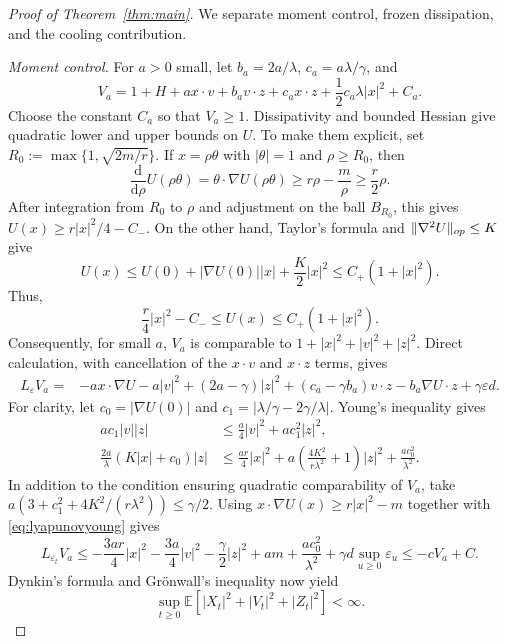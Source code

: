\documentclass[10pt,a4paper]{amsart}
\newcommand{\E}{\mathbb E}
\newcommand{\dd}{\mathrm d}
\newcommand{\eps}{\varepsilon}
\theoremstyle{plain}
\theoremstyle{definition}
\begin{document}
\begin{proof}[Proof of Theorem~\ref{thm:main}]
We separate moment control, frozen dissipation, and the cooling contribution.

\emph{Moment control.}
For $a>0$ small, let $b_a=2a/\lambda$, $c_a=a\lambda/\gamma$, and
\[
 V_a=1+H+a x\cdot v+b_a v\cdot z+c_a x\cdot z
                       +\frac12c_a\lambda|x|^2+C_a.
\]
Choose the constant $C_a$ so that $V_a\geq1$. Dissipativity and bounded Hessian
give quadratic lower and upper bounds on $U$.
To make them explicit, set
$R_0:=\max\{1,\sqrt{2m/r}\}$. If $x=\rho\theta$ with $|\theta|=1$ and
$\rho\geq R_0$, then
\[
 \frac{\dd}{\dd\rho}U(\rho\theta)
 =\theta\cdot\nabla U(\rho\theta)
 \geq r\rho-\frac m\rho\geq\frac r2\rho.
\]
After integration from $R_0$ to $\rho$ and adjustment on the ball $B_{R_0}$,
this gives $U(x)\geq r|x|^2/4-C_-$. On the other hand, Taylor's formula and
$\|\nabla^2U\|_{\rm op}\leq K$ give
\[
 U(x)\leq U(0)+|\nabla U(0)||x|+\frac K2|x|^2
 \leq C_+(1+|x|^2).
\]
Thus,
\begin{equation}\label{eq:quadraticU}
 \frac r4|x|^2-C_-\leq U(x)\leq C_+(1+|x|^2).
\end{equation}
Consequently, for small $a$,
$V_a$ is comparable to $1+|x|^2+|v|^2+|z|^2$.
Direct calculation, with cancellation of the $x\cdot v$ and $x\cdot z$ terms,
gives
\begin{align*}
 L_\eps V_a={}&-a x\cdot\nabla U-a|v|^2+(2a-\gamma)|z|^2
 +(c_a-\gamma b_a)v\cdot z-b_a\nabla U\cdot z+\gamma\eps d.
\end{align*}
For clarity, let $c_0=|\nabla U(0)|$ and
$c_1=|\lambda/\gamma-2\gamma/\lambda|$. Young's inequality gives
\begin{align}\label{eq:lyapunovyoung}
 a c_1|v||z|&\leq\frac a4|v|^2+a c_1^2|z|^2,\\
 \frac{2a}{\lambda}(K|x|+c_0)|z|
 &\leq\frac{ar}{4}|x|^2
       +a\left(\frac{4K^2}{r\lambda^2}+1\right)|z|^2
       +\frac{a c_0^2}{\lambda^2}.
\end{align}
In addition to the condition ensuring quadratic comparability of $V_a$, take
$a(3+c_1^2+4K^2/(r\lambda^2))\leq\gamma/2$.
Using $x\cdot\nabla U(x)\geq r|x|^2-m$ together with
\eqref{eq:lyapunovyoung} gives
\[
 L_{\eps_t}V_a
 \leq-\frac{3ar}{4}|x|^2-\frac{3a}{4}|v|^2-\frac{\gamma}{2}|z|^2
       +am+\frac{ac_0^2}{\lambda^2}+\gamma d\sup_{u\geq0}\eps_u
 \leq-cV_a+C.
\]
Dynkin's formula and Gr\"{o}nwall's inequality now yield
\begin{equation}\label{eq:moments}
 \sup_{t\geq0}\E\left[|X_t|^2+|V_t|^2+|Z_t|^2\right]<\infty.

\end{equation}
\end{proof}
\end{document}
